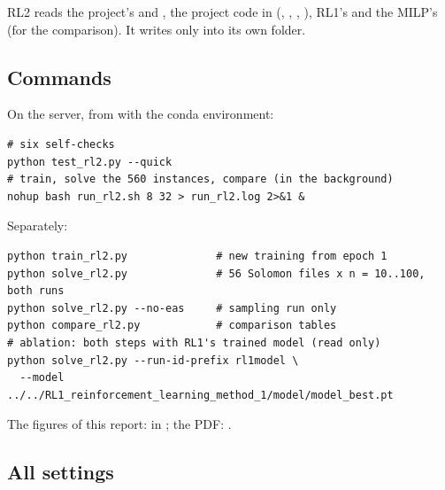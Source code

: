 RL2 reads the project's  and , the project code in  (, , , ), RL1's  and the MILP's  (for the comparison). It writes only into its own folder.

\subsection{Commands}

On the server, from  with the  conda environment:
{\small
\begin{verbatim}
# six self-checks
python test_rl2.py --quick
# train, solve the 560 instances, compare (in the background)
nohup bash run_rl2.sh 8 32 > run_rl2.log 2>&1 &
\end{verbatim}}
Separately:
{\small
\begin{verbatim}
python train_rl2.py              # new training from epoch 1
python solve_rl2.py              # 56 Solomon files x n = 10..100, both runs
python solve_rl2.py --no-eas     # sampling run only
python compare_rl2.py            # comparison tables
# ablation: both steps with RL1's trained model (read only)
python solve_rl2.py --run-id-prefix rl1model \
  --model ../../RL1_reinforcement_learning_method_1/model/model_best.pt
\end{verbatim}}
The figures of this report:  in ; the PDF: .

\subsection{All settings}

